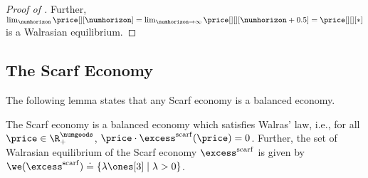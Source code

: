 \begin{proof}[Proof of ]
        Further, $\lim_{\numhorizon} \price[][\numhorizon] = \lim_{\numhorizon \to \infty} \price[][][\numhorizon + 0.5] = \price[][][*]$ is a Walrasian equilibrium.

\end{proof}


\subsection{The Scarf Economy}


The following lemma states that any Scarf economy is a balanced economy.
\begin{lemma}
    The Scarf economy is a balanced economy which satisfies Walras' law, i.e., for all $\price \in \R^\numgoods_+$, $\price \cdot \excess^{\mathrm{scarf}}(\price) = 0$. Further, the set of Walrasian equilibrium of the Scarf economy $\excess^{\mathrm{scarf}}$ is given by $\we(\excess^{\mathrm{scarf}}) \doteq \{\lambda \ones[3] \mid \lambda > 0\}$.
\end{lemma}


